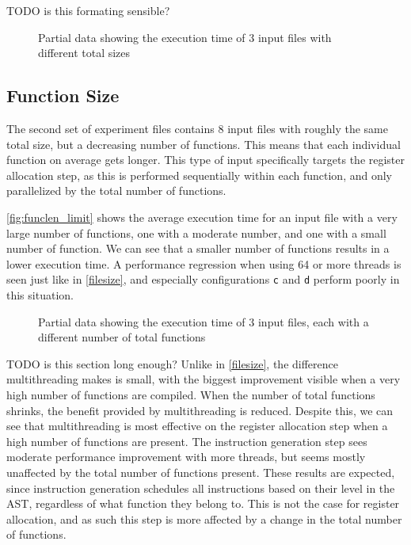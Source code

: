 \documentclass[12pt,dvipsnames]{article}
\newcommand{\helpme}[1]{{\color{red}#1}}
\newcommand{\mono}[1]{\texttt{#1}}
\begin{document}
\helpme{TODO is this formating sensible?}
\begin{figure}[!ht]
    \centering
    \caption{Partial data showing the execution time of 3 input files with different total sizes}
    \label{fig:basic_limit}
\end{figure}

\subsection{Function Size}
The second set of experiment files contains 8 input files with roughly the same total size, but a decreasing number of functions. This means that each individual function on average gets longer. This type of input specifically targets the register allocation step, as this is performed sequentially within each function, and only parallelized by the total number of functions.

\autoref{fig:funclen_limit} shows the average execution time for an input file with a very large number of functions, one with a moderate number, and one with a small number of function. We can see that a smaller number of functions results in a lower execution time. A performance regression when using 64 or more threads is seen just like in \autoref{filesize}, and especially configurations \mono{c} and \mono{d} perform poorly in this situation.

\begin{figure}[!ht]
    \centering
    \caption{Partial data showing the execution time of 3 input files, each with a different number of total functions}
    \label{fig:funclen_limit}
\end{figure}

\helpme{TODO is this section long enough?}
Unlike in \autoref{filesize}, the difference multithreading makes is small, with the biggest improvement visible when a very high number of functions are compiled. When the number of total functions shrinks, the benefit provided by multithreading is reduced. Despite this, we can see that multithreading is most effective on the register allocation step when a high number of functions are present. The instruction generation step sees moderate performance improvement with more threads, but seems mostly unaffected by the total number of functions present. These results are expected, since instruction generation schedules all instructions based on their level in the AST, regardless of what function they belong to. This is not the case for register allocation, and as such this step is more affected by a change in the total number of functions.
\end{document}
